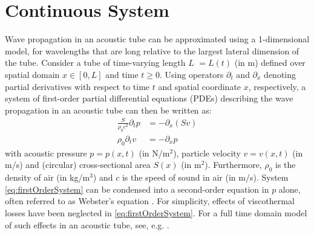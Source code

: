\section{Continuous System}\label{sec:continuous}
Wave propagation in an acoustic tube can be approximated using a 1-dimensional model, for wavelengths that are long relative to the largest lateral dimension of the tube. Consider a tube of time-varying length $L$ $=L(t)$ (in m) defined over spatial domain $x\in [0, L]$ and time $t\geq 0$. Using operators $\partial_t$ and $\partial_x$ denoting partial derivatives with respect to time $t$ and spatial coordinate $x$, respectively, a system of first-order partial differential equations (PDEs) describing the wave propagation in an acoustic tube can then be written as:
\begin{subequations}\label{eq:firstOrderSystem}
    \begin{align}
        \frac{S}{\rho_0 c^2}\partial_t p &= -\partial_x(Sv)\label{eq:contPressure}\\
        \rho_0\partial_tv &= -\partial_xp\label{eq:contVelocity}
    \end{align}
\end{subequations}
with acoustic pressure $p = p(x,t)$ (in N/m$^2$), particle velocity $v = v(x,t)$ (in m/s) and (circular) cross-sectional area $S(x)$ (in m$^2$). Furthermore, $\rho_0$ is the density of air (in kg/m$^3$) and $c$ is the speed of sound in air (in m/s). System \eqref{eq:firstOrderSystem} can be condensed into a second-order equation in $p$ alone, often referred to as Webster's equation \cite{Webster19}.  %
For simplicity, effects of viscothermal losses have been neglected in \eqref{eq:firstOrderSystem}. For a full time domain model of such effects in an acoustic tube, see, e.g. \cite{Bilbao2016}. 

